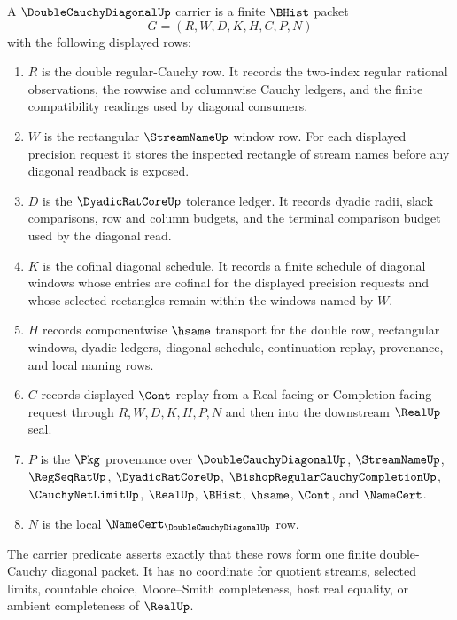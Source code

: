 \begin{definition}
\label{def:double-cauchy-diagonal-carrier}
A $\DoubleCauchyDiagonalUp$ carrier is a finite $\BHist$ packet
$$
G=(R,W,D,K,H,C,P,N)
$$
with the following displayed rows:
\begin{enumerate}
\item $R$ is the double regular-Cauchy row. It records the two-index regular rational observations, the rowwise and columnwise Cauchy ledgers, and the finite compatibility readings used by diagonal consumers.
\item $W$ is the rectangular $\StreamNameUp$ window row. For each displayed precision request it stores the inspected rectangle of stream names before any diagonal readback is exposed.
\item $D$ is the $\DyadicRatCoreUp$ tolerance ledger. It records dyadic radii, slack comparisons, row and column budgets, and the terminal comparison budget used by the diagonal read.
\item $K$ is the cofinal diagonal schedule. It records a finite schedule of diagonal windows whose entries are cofinal for the displayed precision requests and whose selected rectangles remain within the windows named by $W$.
\item $H$ records componentwise $\hsame$ transport for the double row, rectangular windows, dyadic ledgers, diagonal schedule, continuation replay, provenance, and local naming rows.
\item $C$ records displayed $\Cont$ replay from a Real-facing or Completion-facing request through $R,W,D,K,H,P,N$ and then into the downstream $\RealUp$ seal.
\item $P$ is the $\Pkg$ provenance over $\DoubleCauchyDiagonalUp$, $\StreamNameUp$, $\RegSeqRatUp$, $\DyadicRatCoreUp$, $\BishopRegularCauchyCompletionUp$, $\CauchyNetLimitUp$, $\RealUp$, $\BHist$, $\hsame$, $\Cont$, and $\NameCert$.
\item $N$ is the local $\NameCert_{\DoubleCauchyDiagonalUp}$ row.
\end{enumerate}
The carrier predicate asserts exactly that these rows form one finite double-Cauchy diagonal packet. It has no coordinate for quotient streams, selected limits, countable choice, Moore--Smith completeness, host real equality, or ambient completeness of $\RealUp$.
\end{definition}

